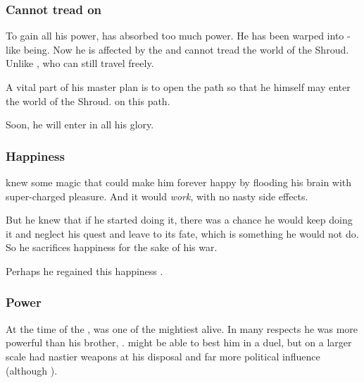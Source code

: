 \subsubsection{Cannot tread on \Miith}
To gain all his power, \Secherdamon{} has absorbed too much \xzaishannic{} power. 
He has been warped into \xzaishann-like being. 
Now he is affected by the  and cannot tread the world of the Shroud. Unlike \Ishnaruchaefir, who can still travel freely.

A vital part of his master plan is to open the path so that he himself may enter the world of the Shroud.  on this path.

Soon, he will enter \Miith{} in all his glory.






\subsubsection{Happiness}
\Secherdamon{} knew some magic that could make him forever happy by flooding his brain with super-charged pleasure. 
And it would \emph{work}, with no nasty side effects. 

But he knew that if he started doing it, there was a chance he would keep doing it and neglect his quest and leave \Miith{} to its fate, which is something he would not do. 
So he sacrifices happiness for the sake of his war. 

Perhaps he regained this happiness . 





\subsubsection{Power}
At the time of the , \Secherdamon{} was one of the mightiest \dragons{} alive. 
In many respects he was more powerful than his brother, \Ishnaruchaefir. 
\Ishnaruchaefir{} might be able to best him in a duel, but on a larger scale \Secherdamon{} had nastier weapons at his disposal and far more political influence (although ). 

